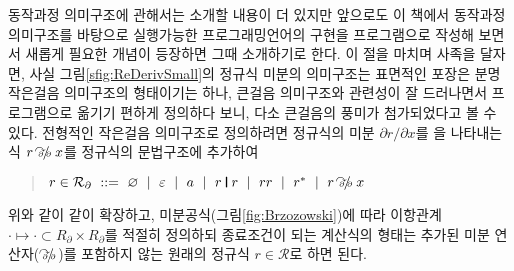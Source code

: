 \begin{comment}
{
\newcommand{\simpRE}[0]{\mathrlap{~~^{\,_\mathfrak{s}}}\longmapsto}
\begin{multline}
a\\
\varnothing \VERT r \simpRE r \\
r \VERT \varnothing \simpRE r \\
\varnothing\,r \simpRE \varnothing \\
r\,\varnothing \simpRE \varnothing \\
\varepsilon\,r \simpRE r \\
r\,\varepsilon \simpRE r \\
\varnothing^{*} \simpRE \varepsilon \\
\varepsilon^{*} \simpRE \varepsilon \\
\inference{r_1\simpRE r_1'}{r_1 \VERT r_2 \simpRE r_1'\VERT r_2 } \\
\inference{r_2\simpRE r_2'}{r_1 \VERT r_2 \simpRE r_1 \VERT r_2'} \\
\inference{r_1\simpRE r_1'}{r_1\,r_2 \simpRE r_1' r_2 } \\
\inference{r_2\simpRE r_2'}{r_1\,r_2 \simpRE r_1\,r_2'} \\
\inference{r\simpRE r'}{r^{*} \simpRE r'^{*}} \\
b
\end{multline}
}
\end{comment}

동작과정 의미구조에 관해서는 소개할 내용이 더 있지만 앞으로도
이 책에서 동작과정 의미구조를 바탕으로 실행가능한 프로그래밍언어의
구현을 프로그램으로 작성해 보면서 새롭게 필요한 개념이 등장하면
그때 소개하기로 한다. 이 절을 마치며 사족을 달자면, 사실
그림\;\ref{sfig:ReDerivSmall}의 정규식 미분의 의미구조는
표면적인 포장은 분명 작은걸음 의미구조의 형태이기는 하나,
큰걸음 의미구조와 관련성이 잘 드러나면서 프로그램으로 옮기기
편하게 정의하다 보니, 다소 큰걸음의 풍미가 첨가되었다고 볼 수 있다.
전형적인 작은걸음 의미구조로 정의하려면 정규식의 미분
$\partial r/\partial x$를 을 나타내는 식 $r \pdvinfix x$를
정규식의 문법구조에 추가하여
\begin{quote}
$r\in \mathcal{R}_{\partial} ~::=~
 \varnothing ~\mid~ \varepsilon ~\mid~ a ~\mid~
 r\VERT r ~\mid~ rr ~\mid~ r^{*} ~\mid~ r \pdvinfix x$
\end{quote}
위와 같이 같이 확장하고,
미분공식(그림\;\ref{fig:Brzozowski})에 따라 이항관계
$\cdot\!\longmapsto\!\cdot \subset R_{\partial}\times R_{\partial}$를
적절히 정의하되 종료조건이 되는 계산식의 형태는
추가된 미분 연산자($\pdvinfix$)를 포함하지 않는
원래의 정규식 $r\in \mathcal{R}$로 하면 된다.

